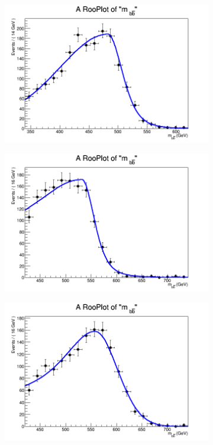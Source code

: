 \begin{figure}[phtb!]
\begin{center}
  \begin{subfigure}[$m_{A}=500$ GeV]{0.4\textwidth}\includegraphics[width=\textwidth]{FitResults/images/fitMC_bAbb500_4.png}\end{subfigure}
  \begin{subfigure}[$m_{A}=550$ GeV]{0.4\textwidth}\includegraphics[width=\textwidth]{FitResults/images/fitMC_bAbb550_4.png}\end{subfigure}
  \begin{subfigure}[$m_{A}=600$ GeV]{0.4\textwidth}\includegraphics[width=\textwidth]{FitResults/images/fitMC_bAbb600_4.png}\end{subfigure}

\end{center}
\end{figure}
